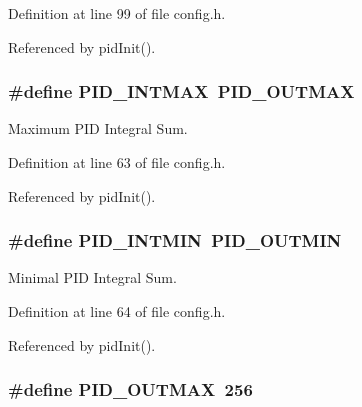 Definition at line 99 of file config.\-h.



Referenced by pid\-Init().

\hypertarget{group__config_ga50582411cbb3f8a20ffd3aa2254ddf71}{
\subsubsection[{P\-I\-D\-\_\-\-I\-N\-T\-M\-A\-X}]{\setlength{\rightskip}{0pt plus 5cm}\#define P\-I\-D\-\_\-\-I\-N\-T\-M\-A\-X~{\bf P\-I\-D\-\_\-\-O\-U\-T\-M\-A\-X}}}\label{group__config_ga50582411cbb3f8a20ffd3aa2254ddf71}


Maximum P\-I\-D Integral Sum. 



Definition at line 63 of file config.\-h.



Referenced by pid\-Init().

\hypertarget{group__config_ga9ee651f30455f25b5ca4c4bb9a0a6e49}{
\subsubsection[{P\-I\-D\-\_\-\-I\-N\-T\-M\-I\-N}]{\setlength{\rightskip}{0pt plus 5cm}\#define P\-I\-D\-\_\-\-I\-N\-T\-M\-I\-N~{\bf P\-I\-D\-\_\-\-O\-U\-T\-M\-I\-N}}}\label{group__config_ga9ee651f30455f25b5ca4c4bb9a0a6e49}


Minimal P\-I\-D Integral Sum. 



Definition at line 64 of file config.\-h.



Referenced by pid\-Init().

\hypertarget{group__config_gaf36e4eab421932a006c7df7e84f11cf0}{
\subsubsection[{P\-I\-D\-\_\-\-O\-U\-T\-M\-A\-X}]{\setlength{\rightskip}{0pt plus 5cm}\#define P\-I\-D\-\_\-\-O\-U\-T\-M\-A\-X~256}}\label{group__config_gaf36e4eab421932a006c7df7e84f11cf0}


